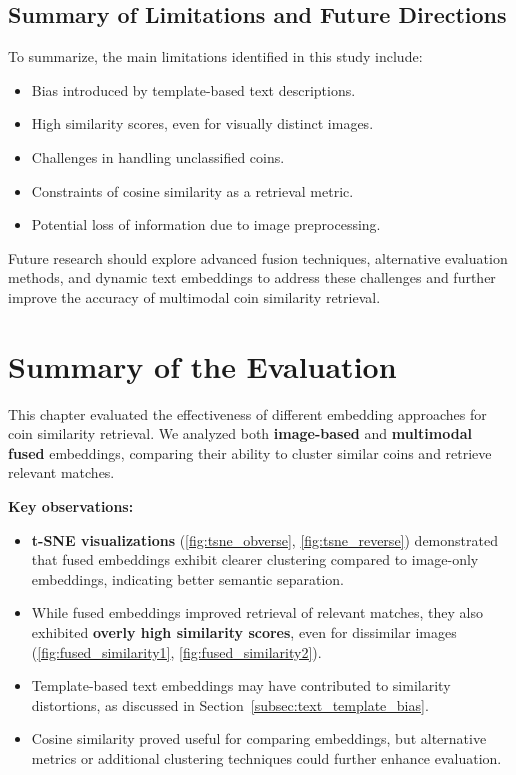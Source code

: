 \documentclass[nolibertine, english, algorithm, nomencl, minted]{ttlab-qualify}
\begin{document}
\subsection{Summary of Limitations and Future Directions}
\label{subsec:limitations_summary}

To summarize, the main limitations identified in this study include:
\begin{itemize}
    \item Bias introduced by template-based text descriptions.
    \item High similarity scores, even for visually distinct images.
    \item Challenges in handling unclassified coins.
    \item Constraints of cosine similarity as a retrieval metric.
    \item Potential loss of information due to image preprocessing.
\end{itemize}

Future research should explore advanced fusion techniques, alternative evaluation methods, 
and dynamic text embeddings to address these challenges and further improve the accuracy of multimodal coin similarity retrieval.


\section{Summary of the Evaluation}
\label{sec:evaluation_summary}

This chapter evaluated the effectiveness of different embedding approaches for coin similarity retrieval. 
We analyzed both \textbf{image-based} and \textbf{multimodal fused} embeddings, comparing their ability to 
cluster similar coins and retrieve relevant matches.

\textbf{Key observations:}
\begin{itemize}
    \item \textbf{t-SNE visualizations} (\ref{fig:tsne_obverse}, \ref{fig:tsne_reverse}) demonstrated that 
    fused embeddings exhibit clearer clustering compared to image-only embeddings, indicating better semantic separation.
    \item While fused embeddings improved retrieval of relevant matches, they also exhibited \textbf{overly high similarity scores}, 
    even for dissimilar images (\ref{fig:fused_similarity1}, \ref{fig:fused_similarity2}).
    \item Template-based text embeddings may have contributed to similarity distortions, 
    as discussed in Section~\ref{subsec:text_template_bias}.
    \item Cosine similarity proved useful for comparing embeddings, but alternative metrics or additional clustering 
    techniques could further enhance evaluation.
\end{itemize}
\end{document}
